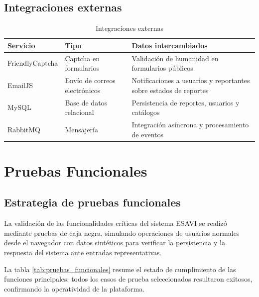 \documentclass[12pt,letterpaper]{article}
\begin{document}
\subsection{Integraciones externas}

\begin{table}[H]
\centering
\caption{Integraciones externas}
\label{tab:integraciones}
\begin{tabular}{|l|p{3.2cm}|p{8cm}|}
\hline
\textbf{Servicio} & \textbf{Tipo} & \textbf{Datos intercambiados} \\ \hline
FriendlyCaptcha & Captcha en formularios & Validación de humanidad en formularios públicos \\ \hline
EmailJS & Envío de correos electrónicos & Notificaciones a usuarios y reportantes sobre estados de reportes \\ \hline
MySQL & Base de datos relacional & Persistencia de reportes, usuarios y catálogos \\ \hline
RabbitMQ & Mensajería & Integración asíncrona y procesamiento de eventos \\ \hline
\end{tabular}
\end{table}














\section{Pruebas Funcionales}

\subsection{Estrategia de pruebas funcionales}

La validación de las funcionalidades críticas del sistema ESAVI se realizó mediante pruebas de caja negra, simulando operaciones de usuarios normales desde el navegador con datos sintéticos para verificar la persistencia y la respuesta del sistema ante entradas representativas.

La tabla \ref{tab:pruebas_funcionales} resume el estado de cumplimiento de las funciones principales: todos los casos de prueba seleccionados resultaron exitosos, confirmando la operatividad de la plataforma.
\end{document}
